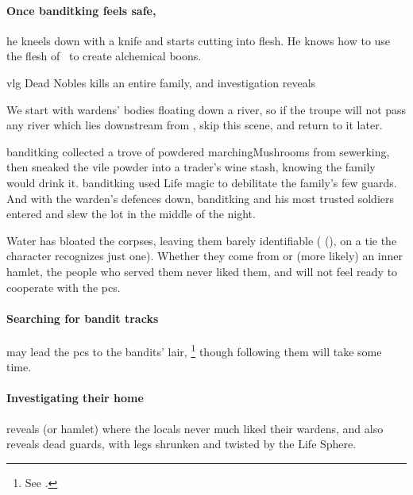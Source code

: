 \paragraph{Once \gls{banditking} feels safe,}
he kneels down with a knife and starts cutting into flesh.
He knows how to use the flesh of \localMonster\ to create alchemical \glspl{boon}.


{\gls{vlg} Dead Nobles}%
{ kills an entire  family, and investigation reveals }%

We start with \glspl{warden}' bodies floating down a river, so if the troupe will not pass any river which lies downstream from , skip this scene, and return to it later.

\begin{exampletext}
  \Gls{banditking} collected a trove of powdered \glspl{marchingMushroom} from \gls{sewerking}, then sneaked the vile powder into a trader's wine stash, knowing the family would drink it.
  \Gls{banditking} used Life magic to debilitate the family's few guards.
  And with the \gls{warden}'s defences down, \gls{banditking} and his most trusted soldiers entered and slew the lot in the middle of the night.
\end{exampletext}

Water has bloated the corpses, leaving them barely identifiable ( (\tn[11]), on a tie the character recognizes just one).
Whether they come from  or (more likely) an inner hamlet, the people who served them never liked them, and will not feel ready to cooperate with the \glspl{pc}.

\paragraph{Searching for bandit tracks}
may lead the \glspl{pc} to the bandits' lair,%
\footnote{See .}
though following them will take some time.

\paragraph{Investigating their home}
reveals  (or hamlet) where the locals never much liked their \glspl{warden}, and also reveals dead guards, with legs shrunken and twisted by the Life Sphere.

